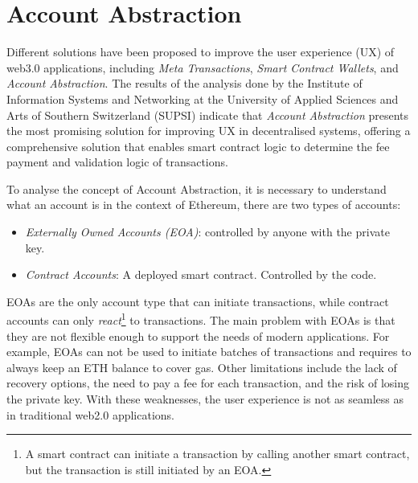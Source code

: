 \section{Account Abstraction}
\label{sec:account_abstraction}


Different solutions have been proposed to improve the user experience (UX) of web3.0 applications, including \textit{Meta Transactions}, \textit{Smart Contract Wallets}, and \textit{Account Abstraction}. The results of the analysis done by the Institute of Information Systems and Networking at the University of Applied Sciences and Arts of Southern Switzerland (SUPSI) indicate that \textit{Account Abstraction} presents the most promising solution for improving UX in decentralised systems, offering a comprehensive solution that enables smart contract logic to determine the fee payment and validation logic of transactions. \cite{isin-aa-user-experience}


To analyse the concept of Account Abstraction, it is necessary to understand what an account is in the context of Ethereum, there are two types of accounts: \cite{ethereum-accounts}
\begin{itemize}
    \item \textit{Externally Owned Accounts (EOA)}: controlled by anyone with the private key.
    \item \textit{Contract Accounts}: A deployed smart contract. Controlled by the code.
\end{itemize}


EOAs are the only account type that can initiate transactions, while contract accounts can only \textit{react}\footnote{A smart contract can initiate a transaction by calling another smart contract, but the transaction is still initiated by an EOA.} to transactions. The main problem with EOAs is that they are not flexible enough to support the needs of modern applications. For example, EOAs can not be used to initiate batches of transactions and requires to always keep an ETH balance to cover gas. Other limitations include the lack of recovery options, the need to pay a fee for each transaction, and the risk of losing the private key. With these weaknesses, the user experience is not as seamless as in traditional web2.0 applications. \cite{ethereum-account-abstraction}


